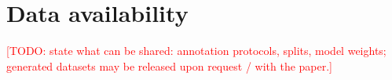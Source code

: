 \documentclass[preprint,12pt]{elsarticle}
\newcommand{\todo}[1]{\textcolor{red}{[TODO: #1]}}
\begin{document}
\section*{Data availability}
\todo{state what can be shared: annotation protocols, splits, model weights;
generated datasets may be released upon request / with the paper.}



\end{document}
